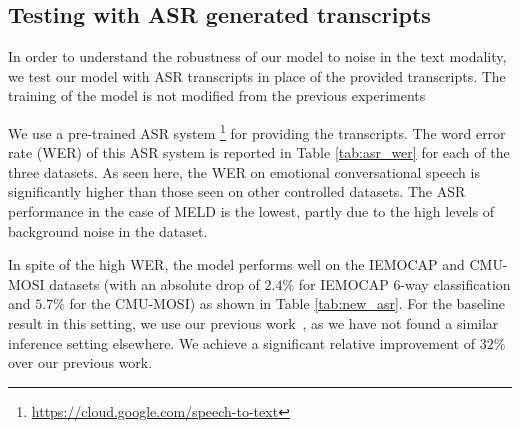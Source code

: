 \documentclass[lettersize,journal]{IEEEtran}
\begin{document}
\subsection{Testing with ASR generated transcripts}
In order to understand the robustness of our model to noise in the text modality, we test our model with ASR transcripts in place of the provided transcripts. The training of the model is not modified from the previous experiments


We use a pre-trained ASR system \footnote{\url{https://cloud.google.com/speech-to-text}\label{googlefoot}} for providing the transcripts. The word error rate (WER) of this ASR system  is reported  in Table \ref{tab:asr_wer} for each of the three datasets. As seen here, the WER on emotional conversational speech is significantly higher than those seen on other controlled datasets. The ASR performance in the case of MELD is the lowest, partly due to the high levels of background noise in the dataset.
\begin{table}[t!]
\caption{\label{tab:new_asr}Weighted F1 score of our system with ASR transcripts during test time on the datasets.}
\begin{center}
\end{center}
\end{table}
In spite of the high WER, the model performs well on the IEMOCAP and CMU-MOSI datasets (with an absolute drop of $2.4\%$ for IEMOCAP $6$-way classification and $5.7\%$ for the CMU-MOSI) as shown in Table \ref{tab:new_asr}. For the baseline result in this setting, we use our previous work~\cite{dutta2022multimodal}, as we have not found a similar inference setting elsewhere.
We achieve a significant relative improvement of $32\%$ over our previous work.
\end{document}

